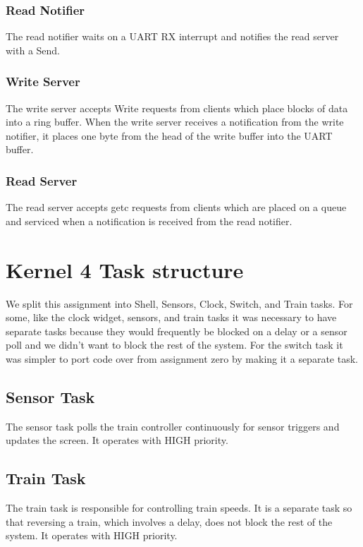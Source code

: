 \documentclass{article}
\begin{document}
\subsubsection{Read Notifier}

The read notifier waits on a UART RX interrupt and notifies the read server with a Send.

\subsubsection{Write Server}

The write server accepts Write requests from clients which place blocks of data into a ring buffer. When the write server receives a notification from the write notifier, it places one byte from the head of the write buffer into the UART buffer.

\subsubsection{Read Server}

The read server accepts getc requests from clients which are placed on a queue and serviced when a notification is received from the read notifier.

\section{Kernel 4 Task structure}

We split this assignment into Shell, Sensors, Clock, Switch, and Train tasks. For some, like the clock widget, sensors, and train tasks it was necessary to have separate tasks because they would frequently be blocked on a delay or a sensor poll and we didn't want to block the rest of the system. For the switch task it was simpler to port code over from assignment zero by making it a separate task.

\subsection{Sensor Task}
The sensor task polls the train controller continuously for sensor triggers and updates the screen. It operates with HIGH priority.

\subsection{Train Task}
The train task is responsible for controlling train speeds. It is a separate task so that reversing a train, which involves a delay, does not block the rest of the system. It operates with HIGH priority.
\end{document}
